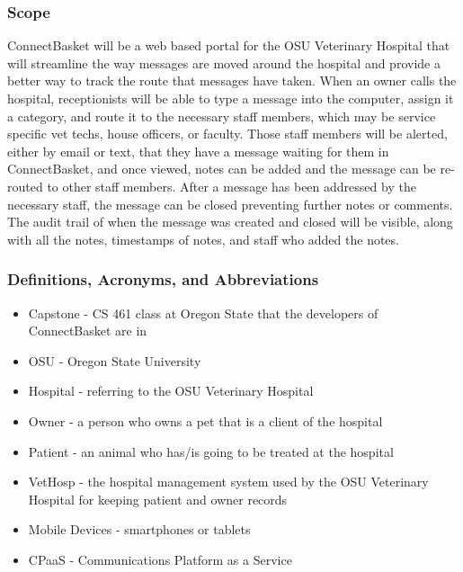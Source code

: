 \documentclass[onecolumn, draftclsnofoot,10pt, compsoc]{IEEEtran}
\begin{document}
\subsubsection{Scope}
ConnectBasket will be a web based portal for the OSU Veterinary Hospital that will streamline the way messages are moved around the hospital and 
provide a better way to track the route that messages have taken. When an owner calls the hospital, receptionists will be able to type a message 
into the computer, assign it a category, and route it to the necessary staff members, which may be service specific vet techs, house officers, or 
faculty. Those staff members will be alerted, either by email or text, that they have a message waiting for them in ConnectBasket, and once viewed, 
notes can be added and the message can be re-routed to other staff members. After a message has been addressed by the necessary staff, the message 
can be closed preventing further notes or comments. The audit trail of when the message was created and closed will be visible, along with all the 
notes, timestamps of notes, and staff who added the notes.


\subsubsection{Definitions, Acronyms, and Abbreviations}
\begin{itemize}
\item Capstone - CS 461 class at Oregon State that the developers of ConnectBasket are in
 
\item OSU - Oregon State University

\item Hospital - referring to the OSU Veterinary Hospital

\item Owner - a person who owns a pet that is a client of the hospital

\item Patient - an animal who has/is going to be treated at the hospital 

\item VetHosp - the hospital management system used by the OSU Veterinary Hospital for keeping patient and owner records

\item Mobile Devices - smartphones or tablets

\item CPaaS  - Communications Platform as a Service
\end{itemize}
\end{document}
